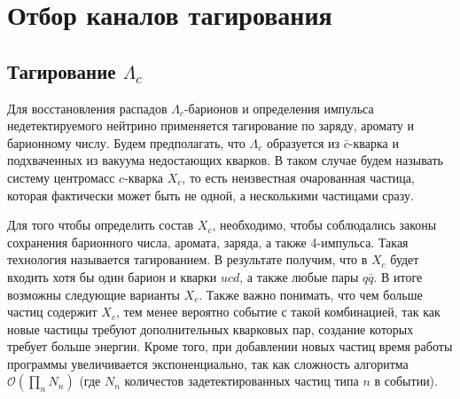 \section{Отбор каналов тагирования}
\label{taging}
\subsection{Тагирование $\Lambda_c$}

Для восстановления распадов $\Lambda_c$-барионов и определения импульса 
недетектируемого нейтрино применяется тагирование по заряду, аромату и 
барионному числу. Будем предполагать, что $\Lambda_c$ образуется из 
$\bar{c}$-кварка и подхваченных из вакуума недостающих кварков. 
В таком случае будем называть систему центромасс $c$-кварка $X_c$, 
то есть неизвестная очарованная частица, которая фактически может быть 
не одной, а несколькими частицами сразу.

\begin{figure}[h!]
    \centering
\end{figure}

Для того чтобы определить состав $X_c$, необходимо, чтобы соблюдались законы 
сохранения барионного числа, аромата, заряда, а также 4-импульса. Такая 
технология называется тагированием. В 
результате получим, что в $X_c$ будет входить хотя бы один барион и кварки 
$u c d$, а также любые пары $q \bar{q}$. В итоге возможны следующие варианты 
$X_c$. Также важно понимать, что чем больше частиц содержит $X_c$, тем менее 
вероятно событие с такой комбинацией, так как новые частицы требуют 
дополнительных кварковых пар, создание которых требует больше энергии. 
Кроме того, при добавлении новых частиц время работы программы увеличивается 
экспоненциально, так как сложность алгоритма $\mathcal{O}(\prod_n N_n)$ 
(где $N_n$ количестов задетектированных частиц типа $n$ в событии).

